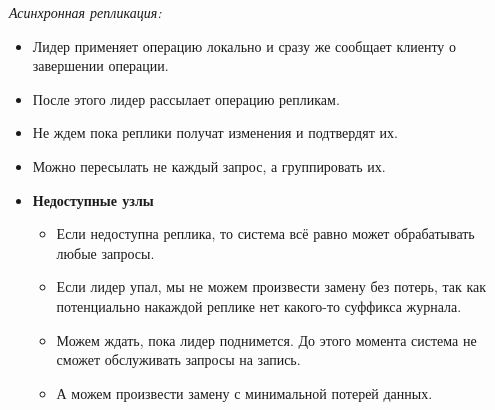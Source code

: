 \begin{definition}
    \textit{Асинхронная репликация:}
    \begin{itemize}
        \item Лидер применяет операцию локально и сразу же сообщает клиенту о завершении операции.
        \item После этого лидер рассылает операцию репликам.
        \item Не ждем пока реплики получат изменения и подтвердят их.
        \item Можно пересылать не каждый запрос, а группировать их.

        \item \textbf{Недоступные узлы}
        \begin{itemize}
            \item Если недоступна реплика, то система всё равно может обрабатывать любые запросы.
            \item Если лидер упал, мы не можем произвести замену без потерь, так как потенциально накаждой реплике нет какого-то суффикса журнала.
            \item Можем ждать, пока лидер поднимется. До этого момента система не сможет обслуживать запросы на запись.
            \item А можем произвести замену с минимальной потерей данных.
        \end{itemize}
    \end{itemize}
\end{definition}
